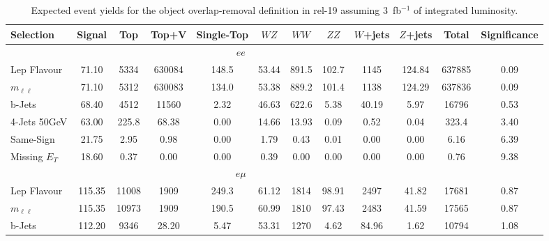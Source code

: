 \begin{table}[htb]
\caption{Expected event yields for the object overlap-removal definition in rel-19 assuming 3~fb$^{-1}$ of integrated luminosity.} 
\label{tab:OverlapRemovalR19}
\begin{center}{\scriptsize
       \begin{tabular}{l|c|   |ccc|ccc|cc|c||c}
            Selection 	& 	   Signal &  	   Top &     	   Top+V &   	Single-Top &      $WZ$ &      	  $WW$ &      	  $ZZ$ &     	   $W$+jets &  	   $Z$+jets &  	   Total &  Significance \\ \hline \hline
           \multicolumn{11}{c}{$ee$} \\ \hline
           Lep Flavour  &  	   71.10 &  	   5334 &  	   630084 &  	   148.5 &  	   53.44 &  	   891.5 &  	   102.7 &  	   1145 &  	   124.84 &  	   637885 & 	 0.09 \\
           $m_{\ell\ell}$ &  	   71.10 &  	   5312 &  	   630083 &  	   134.0 &  	   53.38 &  	   889.2 &  	   101.4 &  	   1138 &  	   124.29 &  	   637836 & 	 0.09 \\
           b-Jets       &  	   68.40 &  	   4512 &  	   11560 &  	   2.32 &  	   46.63 &  	   622.6 &  	   5.38 &  	   40.19 &  	   5.97 &  	   16796 & 	 0.53 \\
           4-Jets 50GeV &  	   63.00 &  	   225.8 &  	   68.38 &  	   0.00 &  	   14.66 &  	   13.93 &  	   0.09 &  	   0.52 &  	   0.04 &  	   323.4 & 	 3.40 \\
           Same-Sign    &  	   21.75 &  	   2.95 &  	   0.98 &  	   0.00 &  	   1.79 &  	   0.43 &  	   0.01 &  	   0.00 &  	   0.00 &  	   6.16 & 	 6.39 \\
           Missing $E_{T}$ &  	   18.60 &  	   0.37 &  	   0.00 &  	   0.00 &  	   0.39 &  	   0.00 &  	   0.00 &  	   0.00 &  	   0.00 &  	   0.76 & 	 9.38 \\
           \hline\multicolumn{11}{c}{$e\mu$} \\ \hline
           Lep Flavour  &  	   115.35 &  	   11008 &  	   1909 &  	   249.3 &  	   61.12 &  	   1814 &  	   98.91 &  	   2497 &  	   41.82 &  	   17681 & 	 0.87 \\
           $m_{\ell\ell}$ &  	   115.35 &  	   10973 &  	   1909 &  	   190.5 &  	   60.99 &  	   1810 &  	   97.43 &  	   2483 &  	   41.59 &  	   17565 & 	 0.87 \\
           b-Jets       &  	   112.20 &  	   9346 &  	   28.20 &  	   5.47 &  	   53.31 &  	   1270 &  	   4.62 &  	   84.96 &  	   1.62 &  	   10794 & 	 1.08 \\

\end{tabular}}
\end{center}
\end{table}
